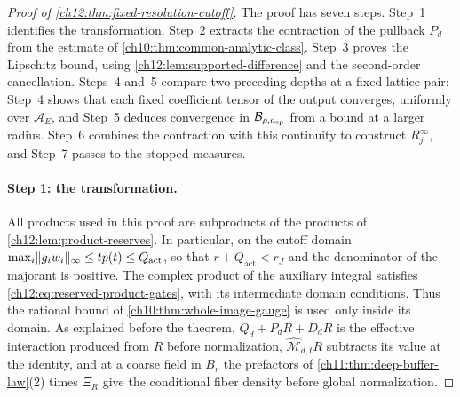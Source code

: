 \begin{proof}[Proof of \cref{ch12:thm:fixed-resolution-cutoff}]
The proof has seven steps. Step~1 identifies the transformation. Step~2 extracts the contraction of the pullback $P_d$ from the estimate of \cref{ch10:thm:common-analytic-class}. Step~3 proves the Lipschitz bound, using \cref{ch12:lem:supported-difference} and the second-order cancellation. Steps~4 and~5 compare two preceding depths at a fixed lattice pair: Step~4 shows that each fixed coefficient tensor of the output converges, uniformly over $\mathcal A_E$, and Step~5 deduces convergence in $\mathcal B_{\rho,a_{\mathrm{sp}}}$ from a bound at a larger radius. Step~6 combines the contraction with this continuity to construct $R_j^\infty$, and Step~7 passes to the stopped measures.

\paragraph{Step 1: the transformation.}
All products used in this proof are subproducts of the products of \cref{ch12:lem:product-reserves}. In particular, on the cutoff domain $\max_i\lVert g_iw_i\rVert_\infty\le tp(t)\le Q_{\mathrm{act}}$, so that $r+Q_{\mathrm{act}}<r_J$ and the denominator of the majorant is positive. The complex product of the auxiliary integral satisfies \eqref{ch12:eq:reserved-product-gates}, with its intermediate domain conditions. Thus the rational bound of \cref{ch10:thm:whole-image-gauge} is used only inside its domain. As explained before the theorem, $Q_d+P_dR+D_dR$ is the effective interaction produced from $R$ before normalization, $\widehat{\mathcal M}_{d,t}R$ subtracts its value at the identity, and at a coarse field in $B_r$ the prefactors of \cref{ch11:thm:deep-buffer-law}(2) times $\Xi_R$ give the conditional fiber density before global normalization.


\end{proof}
